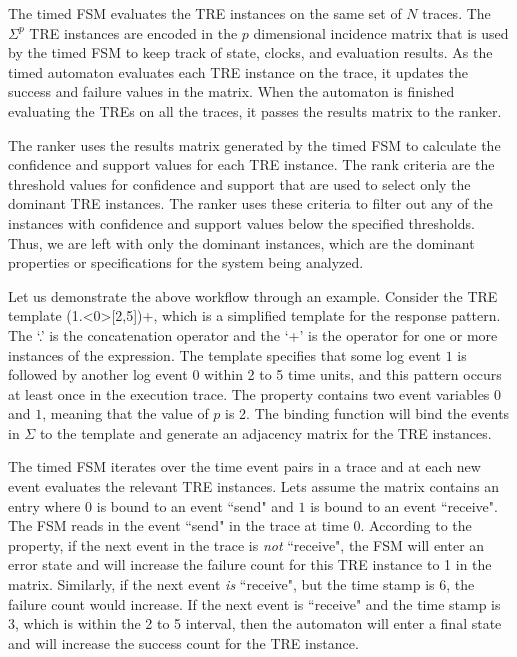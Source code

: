\documentclass[]{sigplanconf}
\begin{document}
The timed FSM evaluates the TRE instances on the same set of $N$ traces. The $\Sigma^p$ TRE instances are encoded in the $p$ dimensional incidence matrix that is used by the timed FSM to keep track of state, clocks, and evaluation results. As the timed automaton evaluates each TRE instance on the trace, it updates the success and failure values in the matrix. When the automaton is finished evaluating the TREs on all the traces, it passes the results matrix to the ranker.


The ranker uses the results matrix generated by the timed FSM to calculate the confidence and support values for each TRE instance. The rank criteria are the threshold values for confidence and support that are used to select only the dominant TRE instances. The ranker uses these criteria to filter out any of the instances with confidence and support values below the specified thresholds. Thus, we are left with only the dominant instances, which are the dominant properties or specifications for the system being analyzed.



Let us demonstrate the above workflow through an example. Consider the TRE template (1.\textless0\textgreater[2,5])+, which is a simplified template for the response pattern. The `.' is the concatenation operator and the `+' is the operator for one or more instances of the expression.  The template specifies that some log event $1$ is followed by another log event $0$ within 2 to 5 time units, and this pattern occurs at least once in the execution trace. The property contains two event variables $0$ and $1$, meaning that the value of $p$ is 2. The binding function will bind the events in $\Sigma$ to the template and generate an adjacency matrix for the TRE instances.

The timed FSM iterates over the time event pairs in a trace and at each new event evaluates the relevant TRE instances. Lets assume the matrix contains an entry where $0$ is bound to an event ``send" and $1$ is bound to an event ``receive". The FSM reads in the event ``send" in the trace at time 0. According to the property, if the next event in the trace is \emph{not} ``receive", the FSM will enter an error state and will increase the failure count for this TRE instance to 1 in the matrix.
Similarly, if the next event \emph{is} ``receive", but the time stamp is 6, the failure count would increase.
If the next event is ``receive" and the time stamp is 3, which is within the 2 to 5 interval, then the automaton will enter a final state and will increase the success count for the TRE instance.
\end{document}
